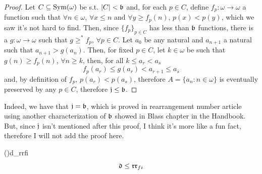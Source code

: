 \begin{proof}
    Let $C\subseteq\mathrm{Sym}(\omega)$ be s.t. $\lvert C\rvert<\mathfrak{b}$ and, for each $p\in C$, define $f_p:\omega\to\omega$ a function such that $\forall n\in\omega$, $\forall x\leq n$ and $\forall y\geq f_p(n)$, $p(x)<p(y)$, which we saw it's not hard to find. Then, since $\{f_p\}_{p\in C}$ has less than $\mathfrak{b}$ functions, there is a $g:\omega\to\omega$ such that $g\geq^* f_p$, $\forall p\in C$. Let $a_0$ be any natural and $a_{n+1}$ a natural such that $a_{n+1}>g(a_n)$. Then, for fixed $p\in C$, let $k\in\omega$ be such that $g(n)\geq f_p(n)$, $\forall n\geq k$, then, for all $k\leq a_r<a_s$
    $$f_p(a_r)\leq g(a_r)<a_{r+1}\leq a_s$$
    and, by definition of $f_p$, $p(a_r)<p(a_s)$, therefore $A=\{a_n:n\in\omega\}$ is eventually preserved by any $p\in C$, therefore $\mathfrak{j}\leq\mathfrak{b}$.
\end{proof}

Indeed, we have that $\mathfrak{j}=\mathfrak{b}$, which is proved in rearrangement number article using another characterization of $\mathfrak{b}$ showed in Blass chapter in the Handbook. But, since $\mathfrak{j}$ isn't mentioned after this proof, I think it's more like a fun fact, therefore I will not add the proof here.

\begin{theorem}{(\cite{blass})}{d_rrfi}
    $$\mathfrak{d}\leq\mathfrak{rr}_{fi}$$
\end{theorem}

